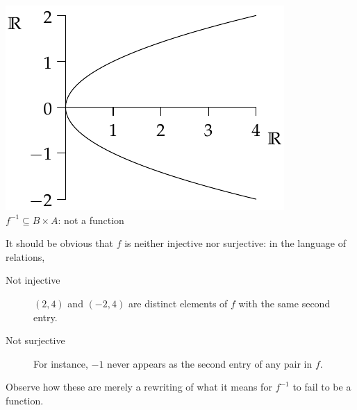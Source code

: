 \begin{examples}
\begin{center}
\begin{minipage}{0.35\textwidth}
\includegraphics[width=\textwidth]{relations-21-reln2}\\
$f^{-1}\subseteq B\times A$: not a function
\end{minipage}
\end{center}
It should be obvious that $f$ is neither injective nor surjective: in the language of relations,
\begin{description}
	\item[Not injective]\quad $(2,4)$ and $(-2,4)$ are distinct elements of $f$ with the same second entry.
	\item[Not surjective]\quad For instance, $-1$ never appears as the second entry of any pair in $f$.
\end{description}
Observe how these are merely a rewriting of what it means for $f^{-1}$ to fail to be a function.


\end{examples}
